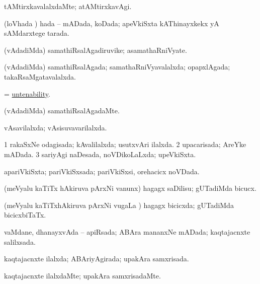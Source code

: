 \bentry
{} 
\gl{\kirxvi}
\expl{}
\bmng
tAMtirxkavalalxdaMte; atAMtirxkavAgi. 
\emng
\eentry

\bentry
{} 
\gl{\gu}
\expl{}
\bmng
(loVhada \vi) hada -- mADada, koDada; apeVkiSxta kAThinayxkekx yA sAMdarxtege tarada. 
\emng
\eentry

\bentry
{} 
\gl{\nA}
\expl{}
\bmng
(vAdadiMda) samathiRsalAgadiruvike; asamathaRniVyate. 
\emng
\eentry

\bentry
{} 
\gl{\gu}
\expl{}
\bmng
(vAdadiMda) samathiRsalAgada; samathaRniVyavalalxda; opapxlAgada; takaRsaMgatavalalxda. 
\emng
\eentry

\bentry
{} 
\gl{\nA}
\expl{}
\bmng
= \hyperlink{untenability}{untenability}. 
\emng
\eentry

\bentry
{} 
\gl{\kirxvi}
\expl{}
\bmng
(vAdadiMda) samathiRsalAgadaMte. 
\emng
\eentry

\bentry
{} 
\gl{\gu}
\expl{}
\bmng
vAsavilalxda; vAsisuvavarilalxda. 
\emng
\eentry

\bentry
{} 
\gl{\gu}
\expl{}
\bmng
\bnum
\num{1} rakaSxNe odagisada; kAvalilalxda; usutxvAri ilalxda. 
\num{2} upacarisada; AreYke mADada. 
\num{3} sariyAgi naDesada, noVDikoLaLxda; upeVkiSxta. 
\enum
\emng
\eentry

\bentry
{} 
\gl{\gu}
\expl{}
\bmng
apariVkiSxta; pariVkiSxsada; pariVkiSxsi, orehacicx noVDada. 
\emng
\eentry

\bentry
{} 
\gl{\sakirx}
\expl{}
\bmng
(meVyalu kaTiTx hAkiruva pArxNi \mo vanunx) hagagx saDilisu; gUTadiMda bicucx. 
\emng
\eentry

\bentry
{} 
\gl{\gu}
\expl{}
\bmng
(meVyalu kaTiTxhAkiruva pArxNi \mo vugaLa \vi) hagagx bicicxda; gUTadiMda bicicxbiTaTx. 
\emng
\eentry

\bentry
{} 
\gl{\gu}
\expl{}
\bmng
vaMdane, dhanayxvAda -- apiRsada; ABAra mananxNe mADada; kaqtajacnxte salilxsada. 
\emng
\eentry

\bentry
{} 
\gl{\gu}
\expl{}
\bmng
kaqtajacnxte ilalxda; ABAriyAgirada; upakAra samxrisada. 
\emng
\eentry

\bentry
{} 
\gl{\kirxvi}
\expl{}
\bmng
kaqtajacnxte ilalxdaMte; upakAra samxrisadaMte. 
\emng
\eentry

